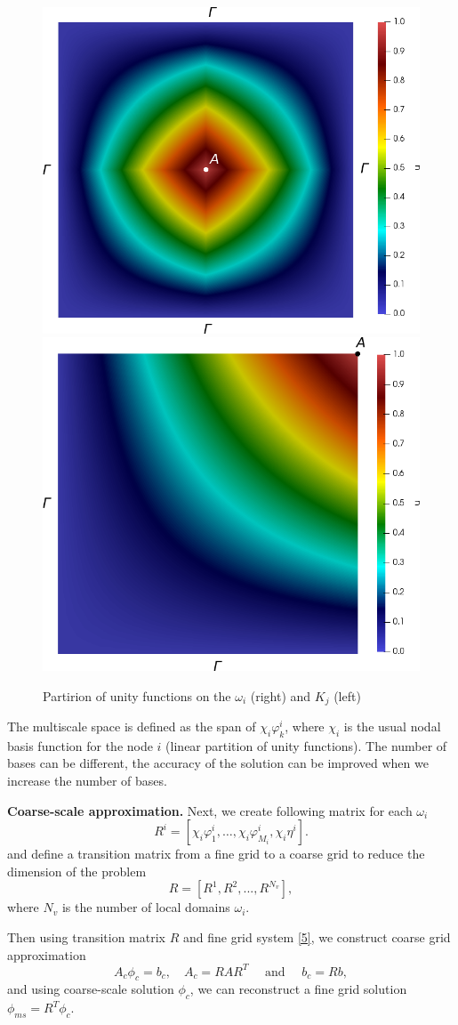 \documentclass[runningheads]{llncs}
\begin{document}
\begin{figure}[h!]
\centering
\includegraphics[width=0.4\linewidth]{pofs.png} 
\hspace{2em}
\includegraphics[width=0.4\linewidth]{pouK.png} 
\caption{Partirion of unity functions on the $\omega_i$ (right) and $K_j$ (left)}
\label{p2}
\end{figure} 
 
The multiscale space is defined as the span of $\chi_i \varphi^i_k$, where $\chi_i$ is the usual nodal basis function for the node $i$ (linear partition of unity functions). 
The number of bases can be different, the accuracy of the solution can be improved when we increase the number of bases.

\textbf{Coarse-scale approximation. }
Next, we create following  matrix for each $\omega_i$
\[
R^i = \left[ \chi_i \varphi_1^i, \ldots, \chi_i \varphi_{M_i}^i,  \chi_i \eta^i \right].
\]
and  define a transition matrix from a fine grid to a coarse grid to reduce the dimension of the problem
\[
R = [ R^1, R^2, ..., R^{N_v} ],
\]
where $N_v$ is the number of local domains $\omega_i$.

Then using transition matrix $R$ and fine grid system  \ref{5}, we construct coarse grid approximation
\begin{equation}\label{e12}
A_c \phi_c = b_c, \quad 
A_c = R A R^T 
\quad \text{ and } \quad 
b_c = R b,
\end{equation}  
and using coarse-scale solution $\phi_c$, we can  reconstruct a fine grid solution $\phi_{ms} = R^T \phi_c$.
\end{document}
